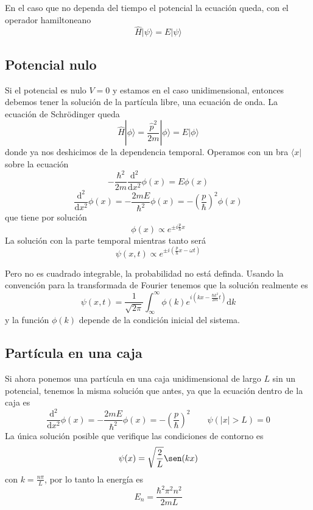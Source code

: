 \documentclass{book}
\numberwithin{equation}{section} %
\begin{document}
En el caso que no dependa del tiempo el potencial la ecuación queda, con el operador hamiltoneano
\begin{equation}
\hat{H} |\psi \rangle = E | \psi \rangle
\end{equation}

\subsection{Potencial nulo}
Si el potencial es nulo $V = 0$ y estamos en el caso unidimensional, entonces debemos tener la solución de la partícula libre, una ecuación de onda.
La ecuación de Schrödinger queda
\[ \hat{H}|\phi\rangle = \frac{\hat{p}^2}{2m} |\phi\rangle = E |\phi\rangle \]
donde ya nos deshicimos de la dependencia temporal.
Operamos con un bra $\langle x|$ sobre la ecuación
\[ -\frac{\hbar^2}{2m} \frac{\mathrm{d}^2}{\mathrm{d}x^2} \phi(x) = E \phi(x) \]
\[ \frac{\mathrm{d}^2}{\mathrm{d}x^2} \phi(x) = - \frac{2 m E}{\hbar^2} \phi(x) = - \left(\frac{p}{\hbar}\right)^2 \phi(x)\]
que tiene por solución
\begin{equation}
    \phi(x) \propto e^{\pm i \frac{p}{\hbar} x}
\end{equation}
La solución con la parte temporal mientras tanto será
\begin{equation}
    \psi(x, t) \propto e^{\pm i \left(\frac{p}{\hbar} x - \omega t\right)}
\end{equation}

Pero no es cuadrado integrable, la probabilidad no está definda.
Usando la convención para la transformada de Fourier tenemos que la solución realmente es
\begin{equation}
    \psi(x, t) = \frac{1}{\sqrt{2\pi}} \int_{\infty}^{\infty} \phi(k) e^{i \left(k x - \frac{\hbar k^2}{2m} t\right)} \mathrm{d}k
\end{equation}
y la función $\phi(k)$ depende de la condición inicial del sistema.

\subsection{Partícula en una caja}
Si ahora ponemos una partícula en una caja unidimensional de largo $L$ sin un potencial, tenemos la misma solución que antes, ya que la ecuación dentro de la caja es
\begin{equation}
    \frac{\mathrm{d}^2}{\mathrm{d}x^2} \phi(x) = - \frac{2 m E}{\hbar^2} \phi(x) = - \left(\frac{p}{\hbar}\right)^2 \qquad \psi(|x| > L) = 0
\end{equation}
La única solución posible que verifique las condiciones de contorno es
\begin{equation}
    \psi(x) = \sqrt{\frac{2}{L}} \sen(k x) 
\end{equation}
con $k = \frac{n \pi}{L}$, por lo tanto la energía es
\begin{equation}
    E_n = \frac{\hbar^2 \pi^2 n^2}{2 m L}
\end{equation}
\end{document}
